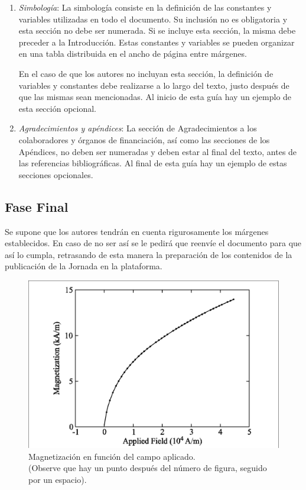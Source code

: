 \documentclass[a4paper, 12pt]{article}
\begin{document}
\begin{enumerate}[label=\arabic*)]
    \item \textit{Simbología}: La simbología consiste en la definición de las constantes y variables utilizadas en todo el documento. Su inclusión no es obligatoria y esta sección no debe ser numerada. Si se incluye esta sección, la misma debe preceder a la Introducción. Estas constantes y variables se pueden organizar en una tabla distribuida en el ancho de página entre márgenes.

    En el caso de que los autores no incluyan esta sección, la definición de variables y constantes debe realizarse a lo largo del texto, justo después de que las mismas sean mencionadas. Al inicio de esta guía hay un ejemplo de esta sección opcional.

    \item \textit{Agradecimientos y apéndices}: La sección de Agradecimientos a los colaboradores y órganos de financiación, así como las secciones de los Apéndices, no deben ser numeradas y deben estar al final del texto, antes de las referencias bibliográficas. Al final de esta guía hay un ejemplo de estas secciones opcionales.

\end{enumerate}

\subsection{Fase Final}

Se supone que los autores tendrán en cuenta rigurosamente los márgenes establecidos. En caso de no ser así se le pedirá que reenvíe el documento para que así lo cumpla, retrasando de esta manera la preparación de los contenidos de la publicación de la Jornada en la plataforma.

\begin{figure}[htbp]
    \centering
    \includegraphics[width=0.5\linewidth]{images/Magnetización en función del campo aplicado.png}
    \caption{Magnetización en función del campo aplicado. \\ (Observe que hay un punto después del número de figura, seguido por un espacio).}
    \label{fig:fig1}
\end{figure}
\end{document}
